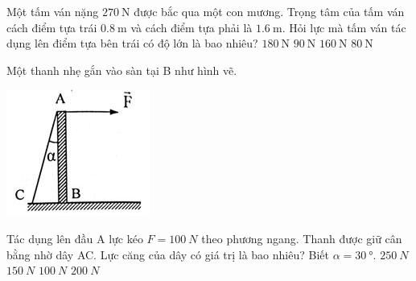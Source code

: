 \begin{ex}
Một tấm ván nặng $\SI{270}{\newton}$ được bắc qua một con mương. Trọng tâm của tấm ván cách điểm tựa trái $\SI{0.8}{\meter}$ và cách điểm tựa phải là $\SI{1.6}{\meter}$. Hỏi lực mà tấm ván tác dụng lên điểm tựa bên trái có độ lớn là bao nhiêu?	
	\choice
	{\True $\SI{180}{\newton}$}
	{$\SI{90}{\newton}$}
	{$\SI{160}{\newton}$}
	{$\SI{80}{\newton}$}
\end{ex}
\begin{ex}
	Một thanh nhẹ gắn vào sàn tại B như hình vẽ.
	\begin{center}
		\includegraphics[scale=1]{../figs/VN10-2021-PH-TP021-6.png}
	\end{center}
	Tác dụng lên đầu A lực kéo $F=\SI{100}{N}$ theo phương ngang. Thanh được giữ cân bằng nhờ dây AC. Lực căng của dây có giá trị là bao nhiêu? Biết $\alpha = \SI{30}{\degree}$.
	\choice
	{$\SI{250}{N}$}
	{$\SI{150}{N}$}
	{$\SI{100}{N}$}
	{\True $\SI{200}{N}$}
\end{ex}
